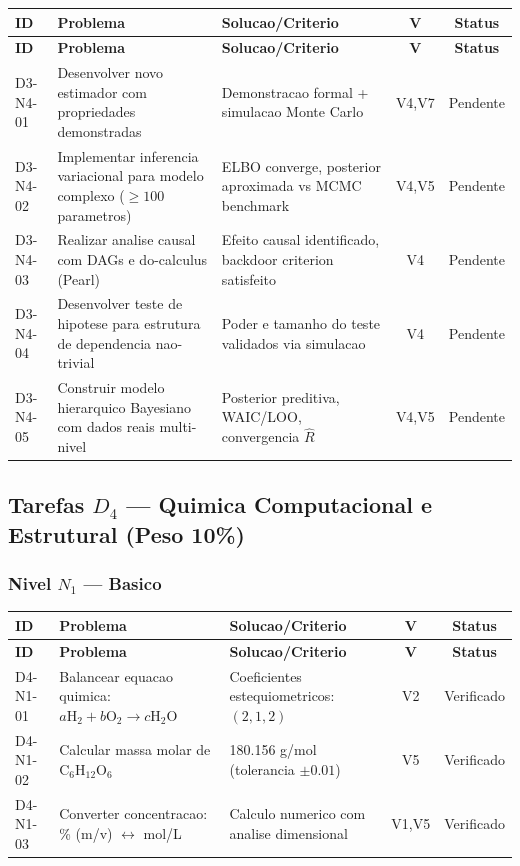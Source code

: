 \begin{longtable}{|p{2.0cm}|p{4.2cm}|p{4.2cm}|c|c|}
\hline
\textbf{ID} & \textbf{Problema} & \textbf{Solucao/Criterio} & \textbf{V} & \textbf{Status} \\
\hline
\endfirsthead
\hline
\textbf{ID} & \textbf{Problema} & \textbf{Solucao/Criterio} & \textbf{V} & \textbf{Status} \\
\hline
\endhead
\hline
\endfoot
D3-N4-01 & Desenvolver novo estimador com propriedades demonstradas & Demonstracao formal + simulacao Monte Carlo & V4,V7 & Pendente \\
\hline
D3-N4-02 & Implementar inferencia variacional para modelo complexo ($\geq 100$ parametros) & ELBO converge, posterior aproximada vs MCMC benchmark & V4,V5 & Pendente \\
\hline
D3-N4-03 & Realizar analise causal com DAGs e do-calculus (Pearl) & Efeito causal identificado, backdoor criterion satisfeito & V4 & Pendente \\
\hline
D3-N4-04 & Desenvolver teste de hipotese para estrutura de dependencia nao-trivial & Poder e tamanho do teste validados via simulacao & V4 & Pendente \\
\hline
D3-N4-05 & Construir modelo hierarquico Bayesiano com dados reais multi-nivel & Posterior preditiva, WAIC/LOO, convergencia $\hat{R}$ & V4,V5 & Pendente \\
\hline
\end{longtable}

\subsection{Tarefas $D_4$ --- Quimica Computacional e Estrutural (Peso 10\%)}

\subsubsection{Nivel $N_1$ --- Basico}

\begin{longtable}{|p{2.0cm}|p{4.2cm}|p{4.2cm}|c|c|}
\hline
\textbf{ID} & \textbf{Problema} & \textbf{Solucao/Criterio} & \textbf{V} & \textbf{Status} \\
\hline
\endfirsthead
\hline
\textbf{ID} & \textbf{Problema} & \textbf{Solucao/Criterio} & \textbf{V} & \textbf{Status} \\
\hline
\endhead
\hline
\endfoot
D4-N1-01 & Balancear equacao quimica: $a\text{H}_{2}+b\text{O}_{2}\rightarrow c\text{H}_{2}\text{O}$ & Coeficientes estequiometricos: $(2,1,2)$ & V2 & Verificado \\
\hline
D4-N1-02 & Calcular massa molar de $\text{C}_{6}\text{H}_{12}\text{O}_{6}$ & 180.156 g/mol (tolerancia $\pm 0.01$) & V5 & Verificado \\
\hline
D4-N1-03 & Converter concentracao: \% (m/v) $\leftrightarrow$ mol/L & Calculo numerico com analise dimensional & V1,V5 & Verificado \\
\hline
\end{longtable}

